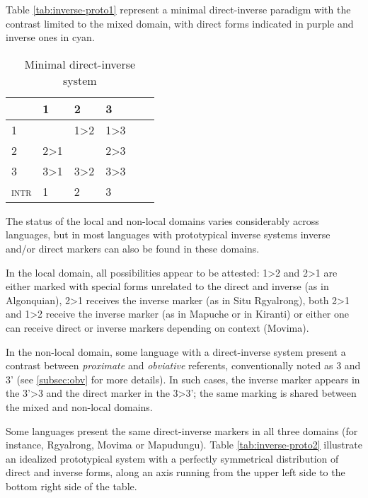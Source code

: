 \documentclass[twoside,a4paper,11pt]{article}
\newcommand{\grise}[1]{\cellcolor{lightgray}\textbf{#1}}
\begin{document}
Table \ref{tab:inverse-proto1} represent a minimal direct-inverse paradigm with the contrast limited to the mixed domain, with direct forms  indicated in purple and inverse ones in cyan.


\begin{table}[h]  \caption{Minimal direct-inverse system} \label{tab:inverse-proto1}
\centering \label{tab:inv-proto}
\begin{tabular}{l|lllll}
\toprule
&1 & 2 &3\\
\hline
1 &\grise{} &1>2 & 1>3\cellcolor[wave]{400} \\
2&2>1&\grise{}&2>3 \cellcolor[wave]{400}\\
3&3>1\cellcolor[wave]{500}&3>2\cellcolor[wave]{500}&3>3\\
\hline
\textsc{intr}&1&2&3\\
\bottomrule
\end{tabular}
\end{table}

 The status of the local and non-local domains varies considerably across languages, but in most languages with prototypical inverse systems inverse and/or direct markers can also be found in these domains.

In the local domain, all possibilities appear to be attested:  1>2 and 2>1 are either marked with special forms unrelated to the direct and inverse (as in Algonquian), 2>1 receives the inverse marker (as in Situ Rgyalrong), both 2>1 and 1>2 receive the inverse marker (as in Mapuche or in Kiranti) or either one can receive direct or inverse markers depending on context (Movima).

In the non-local domain, some language with a direct-inverse system present a contrast between \textit{proximate} and \textit{obviative} referents, conventionally noted as 3 and 3' (see \ref{subsec:obv} for more details). In such cases, the inverse marker appears in the 3'>3 and the direct marker in the 3>3'; the same marking is shared between the mixed and non-local domains.


Some languages  present the same direct-inverse markers in all three domains (for instance, Rgyalrong, Movima or Mapudungu). Table \ref{tab:inverse-proto2} illustrate an idealized prototypical  system with a perfectly symmetrical distribution of direct and inverse forms, along an axis running from the upper left side to the bottom right side of the table.
\end{document}
